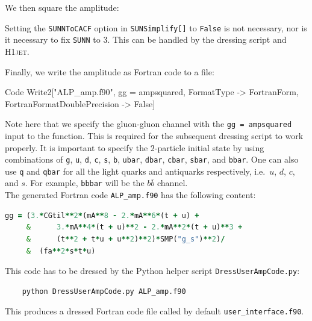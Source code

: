 \documentclass[12pt]{article}
\begin{document}
We then square the amplitude: 
Setting the \texttt{SUNNToCACF} option in \texttt{SUNSimplify[]} to \texttt{False} is not necessary, nor is it necessary to fix \texttt{SUNN} to $3$. This can be handled by the dressing script and \textsc{H1jet}. 

Finally, we  write the amplitude as Fortran code to a file: 
\begin{mmaCell}{Code}
Write2["ALP_amp.f90", gg = ampsquared, FormatType -> FortranForm, FortranFormatDoublePrecision -> False] 
\end{mmaCell}
Note here that we specify the gluon-gluon channel with the \texttt{gg = ampsquared} input to the function. This is required for the subsequent dressing script to work properly. It is important to specify the $2$-particle initial state by using combinations of \texttt{g}, \texttt{u}, \texttt{d}, \texttt{c}, \texttt{s}, \texttt{b}, \texttt{ubar}, \texttt{dbar}, \texttt{cbar}, \texttt{sbar}, and \texttt{bbar}. One can also use \texttt{q} and \texttt{qbar} for all the light quarks and antiquarks respectively, i.e.\ $u$, $d$, $c$, and $s$. For example, \texttt{bbbar} will be the $b\bar{b}$ channel. \\ 

The generated Fortran code \texttt{ALP\_amp.f90} has the following content:
\begin{lstlisting}[language=Fortran,keywordstyle=\color{Red},stringstyle=\color{Green},identifierstyle=\color{Blue},showstringspaces=false]
        gg = (3.*CGtil**2*(mA**8 - 2.*mA**6*(t + u) + 
     &      3.*mA**4*(t + u)**2 - 2.*mA**2*(t + u)**3 + 
     &      (t**2 + t*u + u**2)**2)*SMP("g_s")**2)/
     &  (fa**2*s*t*u)
\end{lstlisting}
This code has to be dressed by the Python helper script \texttt{DressUserAmpCode.py}: 
\begin{lstlisting}
	python DressUserAmpCode.py ALP_amp.f90 
\end{lstlisting}
This produces a dressed Fortran code file called by default
\texttt{user\_interface.f90}.
\end{document}
